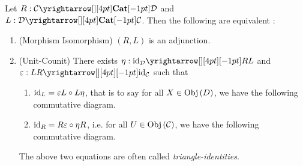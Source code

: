 \begin{prop}
  \hypertarget{unit_char_adj}{}
  
  Let $R : \map{\CC}{\DD}{\CAT}{}$ and $L : \map{\DD}{\CC}{\CAT}{}$.
  Then the following are equivalent : 
  \begin{enumerate}
    \item (Morphism Isomorphism) $(R,L)$ is an adjunction. 
    \item (Unit-Counit) 
    There exists $\eta : \map{\id{\DD}}{RL}{}{}$ and 
    $\ep : \map{LR}{\id{\CC}}{}{}$ such that 
    \begin{enumerate}
      \item $\mathrm{id}_{L} = \varepsilon L \circ L \eta$,
      that is to say for all $X \in \mathrm{Obj}\left(D\right)$, 
      we have the following commutative diagram. 
      \begin{figure}[H]
        \centering
      \end{figure}
      \item $\mathrm{id}_{R} = R\varepsilon \circ \eta R$, i.e. 
      for all $U \in \mathrm{Obj}\left(\mathcal{C}\right)$, 
      we have the following commutative diagram. 
      \begin{figure}[H]
        \centering
      \end{figure}
    \end{enumerate}
    The above two equations are often called \emph{triangle-identities}.
  \end{enumerate}
\end{prop}

